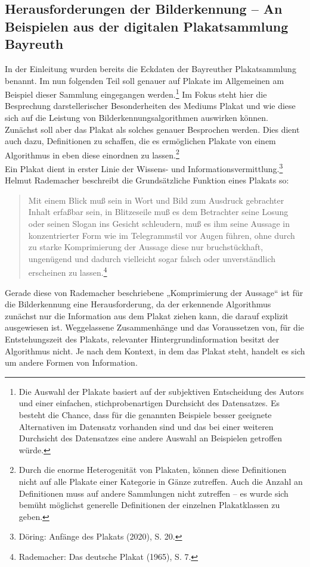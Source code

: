 \documentclass[a4paper,12pt,ngerman]{article}
\begin{document}
\newpage

\subsection{Herausforderungen der Bilderkennung – An Beispielen aus der digitalen Plakatsammlung Bayreuth}
In der Einleitung wurden bereits die Eckdaten der Bayreuther Plakatsammlung benannt. Im nun folgenden Teil soll genauer auf Plakate im Allgemeinen am Beispiel dieser Sammlung eingegangen werden.\footnote{Die Auswahl der Plakate basiert auf der subjektiven Entscheidung des Autors und einer einfachen, stichprobenartigen Durchsicht des Datensatzes. Es besteht die Chance, dass für die genannten Beispiele besser geeignete Alternativen im Datensatz vorhanden sind und das bei einer weiteren Durchsicht des Datensatzes eine andere Auswahl an Beispielen getroffen würde.} Im Fokus steht hier die Besprechung darstellerischer Besonderheiten des Mediums Plakat und wie diese sich auf die Leistung von Bilderkennungsalgorithmen auswirken können. \\
Zunächst soll aber das Plakat als solches genauer Besprochen werden. Dies dient auch dazu, Definitionen zu schaffen, die es ermöglichen Plakate von einem Algorithmus in eben diese einordnen zu lassen.\footnote{Durch die enorme Heterogenität von Plakaten, können diese Definitionen nicht auf alle Plakate einer Kategorie in Gänze zutreffen. Auch die Anzahl an Definitionen muss auf andere Sammlungen nicht zutreffen – es wurde sich bemüht möglichst generelle Definitionen der einzelnen Plakatklassen zu geben.} \\ 
Ein Plakat dient in erster Linie der Wissens- und Informationsvermittlung.\footnote{Döring: Anfänge des Plakats (2020), S. 20.}  Helmut Rademacher beschreibt die Grundsätzliche Funktion eines Plakats so:

\blockquote{\fontsize{10pt}{12pt} \selectfont Mit einem Blick muß sein in Wort und Bild zum Ausdruck gebrachter Inhalt erfaßbar sein, in Blitzeseile muß es dem Betrachter seine Losung oder seinen Slogan ins Gesicht schleudern, muß es ihm seine Aussage in konzentrierter Form wie im Telegrammstil vor Augen führen, ohne durch zu starke Komprimierung der Aussage diese nur bruchstückhaft, ungenügend und dadurch vielleicht sogar falsch oder unverständlich erscheinen zu lassen.\footnote{Rademacher: Das deutsche Plakat (1965), S. 7.}}

Gerade diese von Rademacher beschriebene „Komprimierung der Aussage“ ist für die Bilderkennung eine Herausforderung, da der erkennende Algorithmus zunächst nur die Information aus dem Plakat ziehen kann, die darauf explizit ausgewiesen ist. Weggelassene Zusammenhänge und das Voraussetzen von, für die Entstehungszeit des Plakats, relevanter Hintergrundinformation besitzt der Algorithmus nicht.
Je nach dem Kontext, in dem das Plakat steht, handelt es sich um andere Formen von Information. \\
\end{document}
